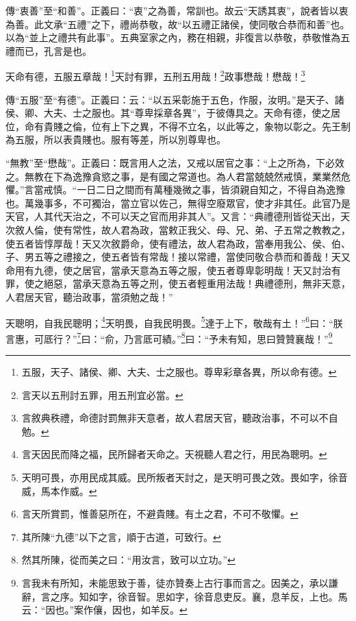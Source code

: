 {\noindent\zhuan{}\fzbyks 傳“衷善”至“和善”。正義曰：“衷”之為善，常訓也。故云“天誘其衷”，說者皆以衷為善。此文承“五禮”之下，禮尚恭敬，故“以五禮正諸侯，使同敬合恭而和善”也。以為“並上之禮共有此事”。五典室家之內，務在相親，非復言以恭敬，恭敬惟為五禮而已，孔言是也。 \par}

天命有德，五服五章哉！\footnote{五服，天子、諸侯、卿、大夫、士之服也。尊卑彩章各異，所以命有德。}天討有罪，五刑五用哉！\footnote{言天以五刑討五罪，用五刑宜必當。}政事懋哉！懋哉！\footnote{言敘典秩禮，命德討罰無非天意者，故人君居天官，聽政治事，不可以不自勉。}

{\noindent\zhuan{}\fzbyks 傳“五服”至“有德”。正義曰：云：“以五采彰施于五色，作服，汝明。”是天子、諸侯、卿、大夫、士之服也。其“尊卑採章各異”，于彼傳具之。天命有德，使之居位，命有貴賤之倫，位有上下之異，不得不立名，以此等之，象物以彰之。先王制為五服，所以表貴賤也。服有等差，所以別尊卑也。 \par}

{\noindent\shu{}\fzkt “無教”至“懋哉”。正義曰：既言用人之法，又戒以居官之事：“上之所為，下必效之。無教在下為逸豫貪慾之事，是有國之常道也。為人君當兢兢然戒慎，業業然危懼。”言當戒慎。“一日二日之間而有萬種幾微之事，皆須親自知之，不得自為逸豫也。萬幾事多，不可獨治，當立官以佐己，無得空廢眾官，使才非其任。此官乃是天官，人其代天治之，不可以天之官而用非其人”。又言：“典禮德刑皆從天出，天次敘人倫，使有常性，故人君為政，當敕正我父、母、兄、弟、子五常之教教之，使五者皆惇厚哉！天又次敘爵命，使有禮法，故人君為政，當奉用我公、侯、伯、子、男五等之禮接之，使五者皆有常哉！接以常禮，當使同敬合恭而和善哉！天又命用有九德，使之居官，當承天意為五等之服，使五者尊卑彰明哉！天又討治有罪，使之絕惡，當承天意為五等之刑，使五者輕重用法哉！典禮德刑，無非天意，人君居天官，聽治政事，當須勉之哉！” \par}

天聰明，自我民聰明；\footnote{言天因民而降之福，民所歸者天命之。天視聽人君之行，用民為聰明。}天明畏，自我民明畏。\footnote{天明可畏，亦用民成其威。民所叛者天討之，是天明可畏之效。畏如字，徐音威，馬本作威。}達于上下，敬哉有土！”\footnote{言天所賞罰，惟善惡所在，不避貴賤。有土之君，不可不敬懼。}曰：“朕言惠，可厎行？”\footnote{其所陳“九德”以下之言，順于古道，可致行。}曰：“俞，乃言厎可績。”\footnote{然其所陳，從而美之曰：“用汝言，致可以立功。”}曰：“予未有知，思曰贊贊襄哉！”\footnote{言我未有所知，未能思致于善，徒亦贊奏上古行事而言之。因美之，承以謙辭，言之序。知如字，徐音智。思如字，徐音息吏反。襄，息羊反，上也。馬云：“因也。”案作儴，因也，如羊反。}

